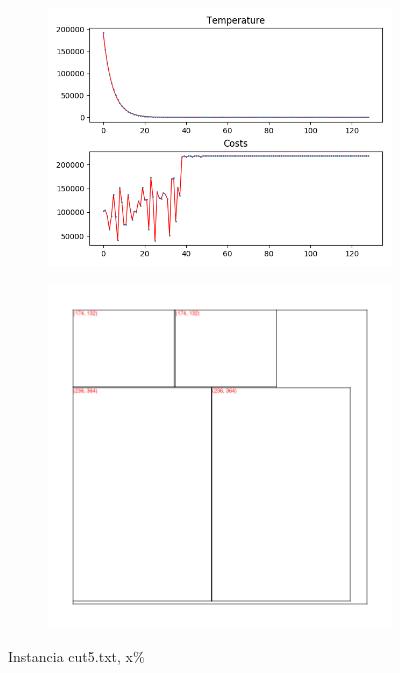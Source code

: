 \begin{figure}
\centering
\begin{subfigure}{.5\textwidth}
  \centering
  \includegraphics[width=1\linewidth]{results/cut5/1/plot}
  \label{fig:sub1}
\end{subfigure}%
\begin{subfigure}{.5\textwidth}
  \centering
  \includegraphics[width=1\linewidth]{results/cut5/1/cut}
  \label{fig:sub2}
\end{subfigure}
\caption{Instancia cut5.txt, x\%}
\label{fig:test}
\end{figure}


